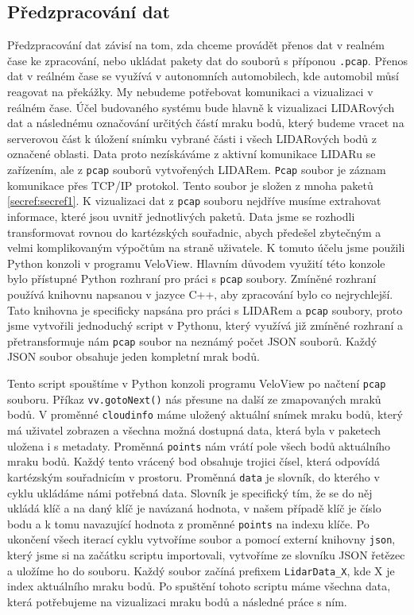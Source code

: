 \documentclass[czech,bachelor,dept420,male,cpdeclaration]{diploma}
\begin{document}
\subsection{Předzpracování dat}\label{secref:predzpracref1}
Předzpracování dat závisí na tom, zda chceme provádět přenos dat v realném čase ke zpracování, nebo ukládat pakety dat do souborů s příponou \texttt{.pcap}. Přenos dat v reálném čase se využívá v autonomních automobilech, kde automobil můsí reagovat na překážky. My nebudeme potřebovat komunikaci a vizualizaci v reálném čase. Účel budovaného systému bude hlavně k vizualizaci LIDARových dat a následnému označování určitých částí mraku bodů, který budeme vracet na serverovou část k úložení snímku vybrané části i všech LIDARových bodů z označené oblasti. 
Data proto nezískáváme z aktivní komunikace LIDARu se zařízením, ale z \texttt{pcap} souborů vytvořených LIDARem. \texttt{Pcap} soubor je záznam komunikace přes TCP/IP protokol. Tento soubor je složen z mnoha paketů \ref{secref:secref1}. K vizualizaci dat z \texttt{pcap} souboru nejdříve musíme extrahovat informace, které jsou uvnitř jednotlivých paketů. Data jsme se rozhodli transformovat rovnou do kartézských souřadnic, abych předešel zbytečným a velmi komplikovaným výpočtům na straně uživatele. K tomuto účelu jsme použili Python konzoli v programu VeloView. Hlavním důvodem využití této konzole bylo přístupné Python rozhraní pro práci s \texttt{pcap} soubory. Zmíněné rozhraní používá knihovnu napsanou v jazyce C++, aby zpracování bylo co nejrychlejší. Tato knihovna je specificky napsána pro práci s LIDARem a \texttt{pcap} soubory, proto jsme vytvořili jednoduchý script v Pythonu, který využívá již zmíněné rozhraní a přetransformuje nám \texttt{pcap} soubor na neznámý počet JSON souborů. Každý JSON soubor obsahuje jeden kompletní mrak bodů.



Tento script spouštíme v Python konzoli programu VeloView po načtení \texttt{pcap} souboru. Příkaz \texttt{vv.gotoNext()} nás přesune na další ze zmapovaných mraků bodů. V proměnné \texttt{cloudinfo} máme uložený aktuální snímek mraku bodů, který má uživatel zobrazen a všechna možná dostupná data, která byla v paketech uložena i s metadaty. Proměnná \texttt{points} nám vrátí pole všech bodů aktuálního mraku bodů. Každý tento vrácený bod obsahuje trojici čísel, která odpovídá kartézským souřadnicím v prostoru. Proměnná \texttt{data} je slovník, do kterého v cyklu ukládáme námi potřebná data. Slovník je specifický tím, že se do něj ukládá klíč a na daný klíč je navázaná hodnota, v našem případě klíč je číslo bodu a k tomu navazující hodnota z proměnné \texttt{points} na indexu klíče. Po ukončení všech iterací cyklu vytvoříme soubor a pomocí externí knihovny \texttt{json}, který jsme si na začátku scriptu importovali, vytvoříme ze slovníku JSON řetězec a uložíme ho do souboru. Každý soubor začíná prefixem \texttt{LidarData\_X}, kde X je index aktuálního mraku bodů. Po spuštění tohoto scriptu máme všechna data, která potřebujeme na vizualizaci mraku bodů a následné práce s ním. 
\end{document}
